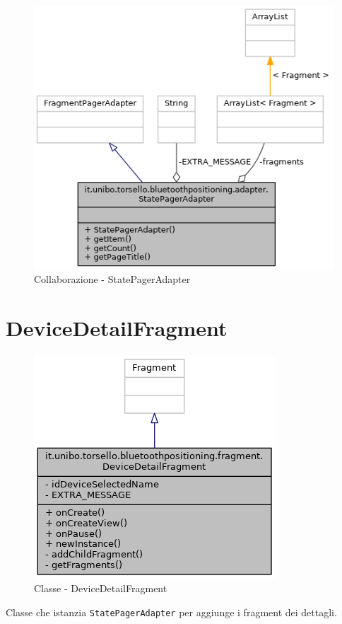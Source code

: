 \begin{figure}[ph]
	\centering
	\includegraphics[width=0.75\linewidth]{img/uml/class/classit_1_1unibo_1_1torsello_1_1bluetoothpositioning_1_1adapter_1_1StatePagerAdapter__coll__graph.png}
	\caption{Collaborazione - StatePagerAdapter}
\end{figure}

\newpage
\section{DeviceDetailFragment}
\begin{figure}[ph]
	\centering
	\includegraphics[width=0.5\linewidth]{img/uml/class/classit_1_1unibo_1_1torsello_1_1bluetoothpositioning_1_1fragment_1_1DeviceDetailFragment__inherit__graph.png}
	\caption{Classe - DeviceDetailFragment}
\end{figure}

Classe che istanzia \texttt{StatePagerAdapter} per aggiunge i fragment dei dettagli.

